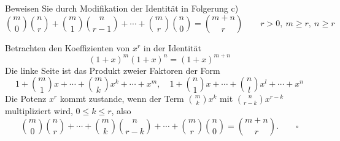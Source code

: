\begin{aufgabe}[Aufgabe 7]
Beweisen Sie durch Modifikation der Identität in Folgerung c)
\[
\binom{m}{0}\binom{n}{r} + \binom{m}{1}\binom{n}{r-1} + \cdots + \binom{m}{r}\binom{n}{0} = \binom{m+n}{r} \qquad r > 0,\ m \geq r,\ n \geq r
\]
\end{aufgabe}

\begin{loesung}
Betrachten den Koeffizienten von $x^r$ in der Identität
\[
(1 + x)^m (1 + x)^n = (1 + x)^{m+n}
\]
Die linke Seite ist das Produkt zweier Faktoren der Form
\[
1 + \binom{m}{1}x + \cdots + \binom{m}{k}x^k + \cdots + x^m, \quad 1 + \binom{n}{1}x + \cdots + \binom{n}{l}x^l + \cdots + x^n
\]
Die Potenz $x^r$ kommt zustande, wenn der Term $\binom{m}{k}x^k$ mit $\binom{n}{r-k}x^{r-k}$ multipliziert wird, $0 \leq k \leq r$, also
\[
\binom{m}{0}\binom{n}{r} + \cdots + \binom{m}{k}\binom{n}{r-k} + \cdots + \binom{m}{r}\binom{n}{0} = \binom{m+n}{r}. \qquad \square
\]
\end{loesung}
